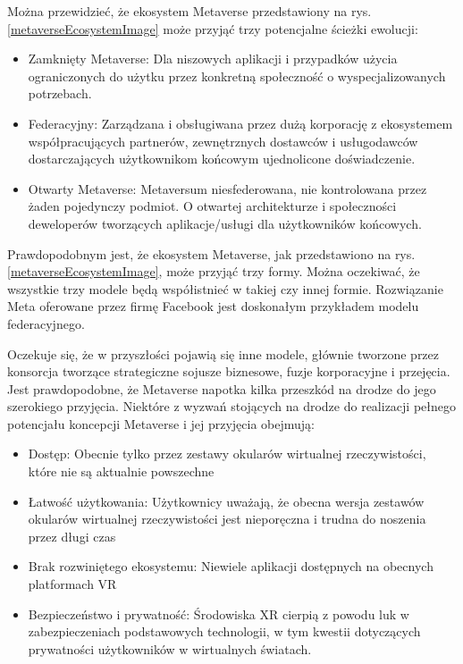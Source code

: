 Można przewidzieć, że ekosystem Metaverse przedstawiony na rys.\ref{metaverseEcosystemImage} może przyjąć trzy potencjalne ścieżki ewolucji:

\begin{itemize}
    \item Zamknięty Metaverse: Dla niszowych aplikacji i przypadków użycia ograniczonych do użytku przez konkretną społeczność o wyspecjalizowanych potrzebach.
    \item Federacyjny: Zarządzana i obsługiwana przez dużą korporację z ekosystemem współpracujących partnerów, zewnętrznych dostawców i usługodawców dostarczających użytkownikom końcowym ujednolicone doświadczenie.
    \item Otwarty Metaverse: Metaversum niesfederowana, nie kontrolowana przez żaden pojedynczy podmiot. O otwartej architekturze i społeczności deweloperów tworzących aplikacje/usługi dla użytkowników końcowych.
\end{itemize}



Prawdopodobnym jest, że ekosystem Metaverse, jak przedstawiono na rys.\ref{metaverseEcosystemImage}, może przyjąć trzy formy. Można oczekiwać, że wszystkie trzy modele będą współistnieć w takiej czy innej formie. Rozwiązanie Meta oferowane przez firmę Facebook jest doskonałym przykładem modelu federacyjnego\cite{metaverseSecurityIssuesChallengesAndViableZTAModel}. 

Oczekuje się, że w przyszłości pojawią się inne modele, głównie tworzone przez konsorcja tworzące strategiczne sojusze biznesowe, fuzje korporacyjne i przejęcia. Jest prawdopodobne, że Metaverse napotka kilka przeszkód na drodze do jego szerokiego przyjęcia. Niektóre z wyzwań stojących na drodze do realizacji pełnego potencjału koncepcji Metaverse i jej przyjęcia obejmują:

\begin{itemize}
    \item Dostęp: Obecnie tylko przez zestawy okularów wirtualnej rzeczywistości, które nie są aktualnie powszechne
    \item Łatwość użytkowania: Użytkownicy uważają, że obecna wersja zestawów okularów wirtualnej rzeczywistości jest nieporęczna i trudna do noszenia przez długi czas
    \item Brak rozwiniętego ekosystemu: Niewiele aplikacji dostępnych na obecnych platformach VR
    \item Bezpieczeństwo i prywatność: Środowiska XR cierpią z powodu luk w zabezpieczeniach podstawowych technologii, w tym kwestii dotyczących prywatności użytkowników w wirtualnych światach. 
\end{itemize}